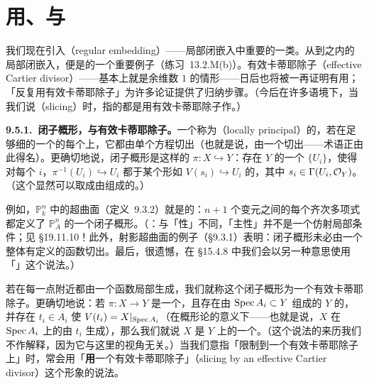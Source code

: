 
\section{用\trEffectiveCartierDivisor{}{}\trSlicing{}、\trRegularSequence{}与\trRegularEmbedding{}}

我们现在引入\trRegularEmbedding{}（regular embedding）——局部闭嵌入中重要的一类。从\trRegular\trScheme{}到\trRegular\trScheme{}之内的局部闭嵌入，便是\trRegularEmbedding{}的一个重要例子（\mbox{练习~13.2.M}(b)）。有效卡蒂耶除子（effective Cartier divisor）——基本上就是余维数 $1$ 的情形——日后也将被一再证明有用；「反复用有效卡蒂耶除子\trSlicing{}」为许多论证提供了归纳步骤。（今后在许多语境下，当我们说\textbf{\trSlicing{}}（slicing）时，指的都是用有效卡蒂耶除子作\trSlicing{}。）

\textbf{9.5.1.\ \trLocallyPrincipal{}闭子概形，与有效卡蒂耶除子。}\quad 一个\trClosedSubscheme{}称为\textbf{\trLocallyPrincipal{}}（locally principal）的，若在足够细的一个\trOpenCover{}的每个\trOpenSet{}上，它都由单个方程切出（也就是说，由一个\trPrincipalIdeal{}切出——术语正由此得名）。更确切地说，\trLocallyPrincipal{}闭子概形是这样的\trClosedSubscheme{} $\pi\colon X\hookrightarrow Y$：存在 $Y$ 的一个\trOpenCover{} $\{U_i\}$，使得对每个 $i$，$\pi^{-1}(U_i)\hookrightarrow U_i$ 都\trIsomorphic{}于某个形如 $V(s_i)\hookrightarrow U_i$ 的\trClosedSubscheme，其中 $s_i\in\Gamma(U_i,\mathcal{O}_Y)$。（这个\trOpenCover{}显然可以取成由\trAffine\trOpenSubset{}组成的。）

例如，$\mathbb{P}^n_k$ 中的超曲面（定义~9.3.2）就是\trLocallyPrincipal{}的：$n+1$ 个变元之间的每个齐次多项式都定义了 $\mathbb{P}^n_A$ 的一个\trLocallyPrincipal{}闭子概形。（\trhWarning：与「\trLocallyPrincipal{}性」不同，「主性」并不是一个仿射局部条件；见 \S19.11.10！此外，射影超曲面的例子（\S9.3.1）表明：\trLocallyPrincipal{}闭子概形未必由一个整体有定义的函数切出。最后，很遗憾，在 \S15.4.8 中我们会以另一种意思使用「\trLocallyPrincipal{}」这个说法。）

若\trIdealSheaf{}在每一点附近都由一个\trNonZerodivisor{}函数局部生成，我们就称这个闭子概形为一个有效卡蒂耶除子。更确切地说：若 $\pi\colon X\to Y$ 是一个\trClosedEmbedding，且存在由\trAffine\trOpenSubset{} $\operatorname{Spec} A_i\subset Y$ 组成的 $Y$ 的\trCover，并存在\trNonZerodivisor{} $t_i\in A_i$ 使 $V(t_i)=X|_{\operatorname{Spec} A_i}$（在概形论的意义下——也就是说，$X$ 在 $\operatorname{Spec} A_i$ 上的\trIdealSheaf{}由 $t_i$ 生成），那么我们就说 $X$ 是 $Y$ 上的一个\textbf{\trEffectiveCartierDivisor{}{}}。（这个说法的来历我们不作解释，因为它与这里的视角无关。）当我们意指「限制到一个有效卡蒂耶除子上」时，常会用「\textbf{用}一个有效卡蒂耶除子\textbf{\trSlicing{}}」（slicing by an effective Cartier divisor）这个形象的说法。

